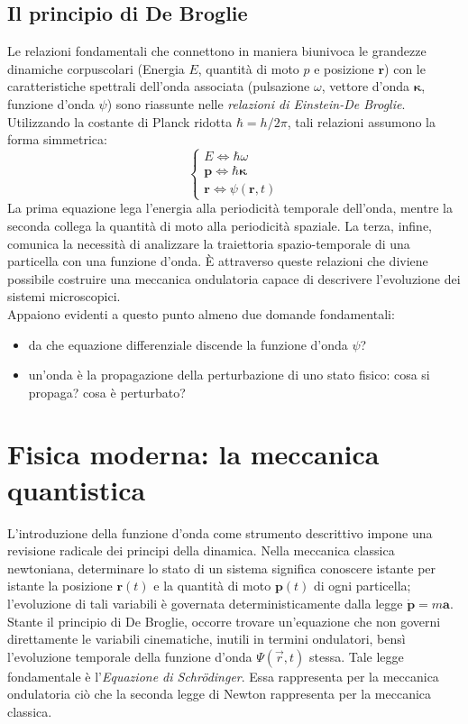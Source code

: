 \documentclass[a4paper,11pt]{report}
\begin{document}
\section{Il principio di De Broglie}

Le relazioni fondamentali che connettono in maniera biunivoca le grandezze dinamiche corpuscolari (Energia $E$, quantità di moto ${p}$ e posizione $\bm{r}$) con le caratteristiche spettrali dell'onda associata (pulsazione $\omega$, vettore d'onda $\bm{\kappa}$, funzione d'onda $\psi$) sono riassunte nelle \textit{relazioni di Einstein-De Broglie}.
Utilizzando la costante di Planck ridotta $\hbar = h/2\pi$, tali relazioni assumono la forma simmetrica:
\begin{equation}
    \begin{cases}
        E \iff \hbar \omega \\
        \bm{p} \iff \hbar \bm{\kappa} \\
        \bm{r} \iff \psi(\bm{r},t) 
        
    \end{cases}
    \label{eq:einstein_debroglie}
\end{equation}
La prima equazione lega l'energia alla periodicità temporale dell'onda, mentre la seconda collega la quantità di moto alla periodicità spaziale. La terza, infine, comunica la necessità di analizzare la traiettoria spazio-temporale di una particella con una funzione d'onda. È attraverso queste relazioni che diviene possibile costruire una meccanica ondulatoria capace di descrivere l'evoluzione dei sistemi microscopici. \\

\noindent
Appaiono evidenti a questo punto almeno due domande fondamentali:
\begin{itemize}
\item da che equazione differenziale discende la funzione d'onda $\psi$?
\item un'onda è la propagazione della perturbazione di uno stato fisico: cosa si propaga? cosa è perturbato?
\end{itemize}
    
    
  \chapter{Fisica moderna: la meccanica quantistica}
L'introduzione della funzione d'onda come strumento descrittivo impone una revisione radicale dei principi della dinamica. Nella meccanica classica newtoniana, determinare lo stato di un sistema significa conoscere istante per istante la posizione $\bm{r}(t)$ e la quantità di moto $\bm{p}(t)$ di ogni particella; l'evoluzione di tali variabili è governata deterministicamente dalla legge $\dot{\bm{p}} = m\bm{a}$.
Stante il principio di De Broglie, occorre trovare un'equazione che non governi direttamente le variabili cinematiche, inutili in termini ondulatori, bensì l'evoluzione temporale della funzione d'onda $\Psi(\vec{r},t)$ stessa.
Tale legge fondamentale è l'\textit{Equazione di Schrödinger}. Essa rappresenta per la meccanica ondulatoria ciò che la seconda legge di Newton rappresenta per la meccanica classica. \\
\end{document}

